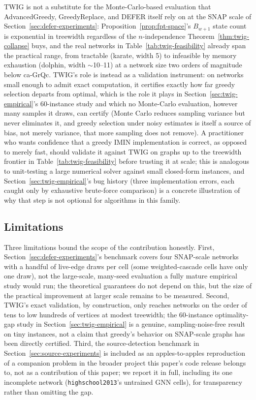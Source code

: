\documentclass[ijoc,sglanonrev]{informs4}
\begin{document}
TWIG is not a substitute for the Monte-Carlo-based evaluation that
AdvancedGreedy, GreedyReplace, and DEFER itself rely on at the SNAP scale
of Section~\ref{sec:defer-experiments}: Proposition~\ref{prop:fpt-space}'s
$B_{w+1}$ state count is exponential in treewidth regardless of the
$n$-independence Theorem~\ref{thm:twig-collapse} buys, and the real
networks in Table~\ref{tab:twig-feasibility} already span the practical
range, from tractable (karate, width 5) to infeasible by memory exhaustion
(dolphin, width $\sim$10--11) at a network size two orders of magnitude
below ca-GrQc. TWIG's role is instead as a validation instrument: on
networks small enough to admit exact computation, it certifies exactly how
far greedy selection departs from optimal, which is the role it plays in
Section~\ref{sec:twig-empirical}'s 60-instance study and which no
Monte-Carlo evaluation, however many samples it draws, can certify (Monte
Carlo reduces sampling variance but never eliminates it, and greedy
selection under noisy estimates is itself a source of bias, not merely
variance, that more sampling does not remove). A practitioner who wants
confidence that a greedy IMIN implementation is correct, as opposed to
merely fast, should validate it against TWIG on graphs up to the treewidth
frontier in Table~\ref{tab:twig-feasibility} before trusting it at scale;
this is analogous to unit-testing a large numerical solver against small
closed-form instances, and Section~\ref{sec:twig-empirical}'s bug history
(three implementation errors, each caught only by exhaustive brute-force
comparison) is a concrete illustration of why that step is not optional
for algorithms in this family.

\subsection{Limitations}

Three limitations bound the scope of the contribution honestly. First,
Section~\ref{sec:defer-experiments}'s benchmark covers four SNAP-scale
networks with a handful of live-edge draws per cell (some weighted-cascade
cells have only one draw), not the large-scale, many-seed evaluation a
fully mature empirical study would run; the theoretical guarantees do not
depend on this, but the size of the practical improvement at larger scale
remains to be measured. Second, TWIG's exact validation, by construction,
only reaches networks on the order of tens to low hundreds of vertices at
modest treewidth; the 60-instance optimality-gap study in
Section~\ref{sec:twig-empirical} is a genuine, sampling-noise-free result
on tiny instances, not a claim that greedy's behavior on SNAP-scale graphs
has been directly certified. Third, the source-detection benchmark in
Section~\ref{sec:source-experiments} is included as an apples-to-apples
reproduction of a companion problem in the broader project this paper's
code release belongs to, not as a contribution of this paper; we report it
in full, including its one incomplete network (\texttt{highschool2013}'s
untrained GNN cells), for transparency rather than omitting the gap.
\end{document}
